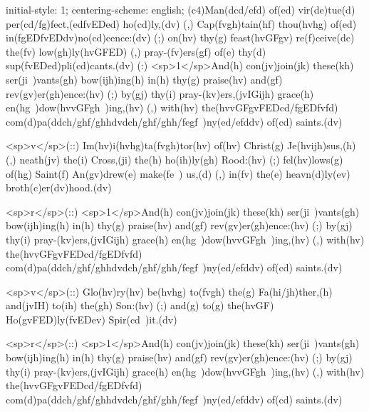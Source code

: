 initial-style: 1;
centering-scheme: english;
(c4)Man(dcd/efd) of(ed) vir(de)tue(d) per(cd/fg)fect,(edfvEDed) ho(cd)ly,(dv) (,) Cap(fvgh)tain(hf) thou(hvhg) of(ed) in(fgEDfvEDdv)no(cd)cence:(dv) (;) on(hv) thy(g) feast(hvGFgv) re(f)ceive(dc) the(fv) low(gh)ly(hvGFED) (,) pray-(fv)ers(gf) of(e) thy(d) sup(fvEDed)pli(cd)cants.(dv) (:) <sp>1</sp>And(h) con(jv)join(jk) these(kh) ser(ji~)vants(gh) bow(ijh)ing(h) in(h) thy(g) praise(hv) and(gf) rev(gv)er(gh)ence:(hv) (;) by(gj) thy(i) pray-(kv)ers,(jvIGijh) grace(h) en(hg~)dow(hvvGFgh~)ing,(hv) (,) with(hv) the(hvvGFgvFEDcd/fgEDfvfd) com(d)pa(ddch/ghf/ghhdvdch/ghf/ghh/fegf~)ny(ed/efddv) of(cd) saints.(dv)

<sp>v</sp>(::) Im(hv)i(hvhg)ta(fvgh)tor(hv) of(hv) Christ(g) Je(hvijh)sus,(h) (,) neath(jv) the(i) Cross,(ji) the(h) ho(ih)ly(gh) Rood:(hv) (;) fel(hv)lows(g) of(hg) Saint(f) An(gv)drew(e) make(fe~) us,(d) (,) in(fv) the(e) heavn(d)ly(ev) broth(c)er(dv)hood.(dv)

<sp>r</sp>(::) <sp>1</sp>And(h) con(jv)join(jk) these(kh) ser(ji~)vants(gh) bow(ijh)ing(h) in(h) thy(g) praise(hv) and(gf) rev(gv)er(gh)ence:(hv) (;) by(gj) thy(i) pray-(kv)ers,(jvIGijh) grace(h) en(hg~)dow(hvvGFgh~)ing,(hv) (,) with(hv) the(hvvGFgvFEDcd/fgEDfvfd) com(d)pa(ddch/ghf/ghhdvdch/ghf/ghh/fegf~)ny(ed/efddv) of(cd) saints.(dv)

<sp>v</sp>(::) Glo(hv)ry(hv) be(hvhg) to(fvgh) the(g) Fa(hi/jh)ther,(h) and(jvIH) to(ih) the(gh) Son:(hv) (;) and(g) to(g) the(hvGF) Ho(gvFED)ly(fvEDev) Spir(cd~)it.(dv)

<sp>r</sp>(::) <sp>1</sp>And(h) con(jv)join(jk) these(kh) ser(ji~)vants(gh) bow(ijh)ing(h) in(h) thy(g) praise(hv) and(gf) rev(gv)er(gh)ence:(hv) (;) by(gj) thy(i) pray-(kv)ers,(jvIGijh) grace(h) en(hg~)dow(hvvGFgh~)ing,(hv) (,) with(hv) the(hvvGFgvFEDcd/fgEDfvfd) com(d)pa(ddch/ghf/ghhdvdch/ghf/ghh/fegf~)ny(ed/efddv) of(cd) saints.(dv)